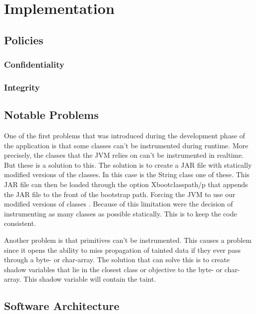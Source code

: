 \chapter{Implementation}


\section{Policies}


\subsection{Confidentiality}


\subsection{Integrity}


\section{Notable Problems}
One of the first problems that was introduced during the development phase of the application is that some classes can't be instrumented during runtime. More precisely, the classes that the JVM relies on can't be instrumented in realtime. But these is a solution to this. The solution is to create a JAR file with statically modified versions of the classes. In this case is the String class one of these. This JAR file can then be loaded through the option Xbootclasspath/p that appends the JAR file to the front of the bootstrap path. Forcing the JVM to use our modified versions of classes \parencite{xboot}. Because of this limitation were the decision of instrumenting as many classes as possible statically. This is to keep the code consistent.

Another problem is that primitives can't be instrumented. This causes a problem since it opens the ability to miss propagation of tainted data if they ever pass through a byte- or char-array. The solution that can solve this is to create shadow variables that lie in the closest class or objective to the byte- or char-array. This shadow variable will contain the taint.


\section{Software Architecture}
